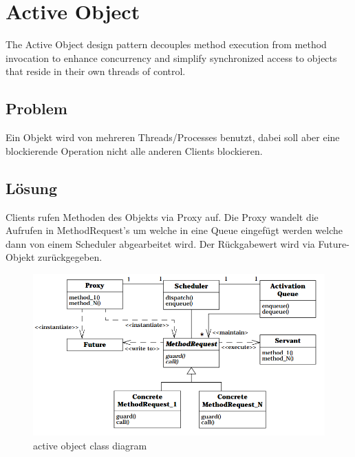 \section{Active Object}

The Active Object design pattern decouples method execution from method invocation to enhance concurrency and simplify synchronized access to objects that reside in their own threads of control.


\subsection{Problem}


Ein Objekt wird von mehreren Threads/Processes benutzt, dabei soll aber eine blockierende Operation nicht alle anderen Clients blockieren.

\subsection{Lösung}


Clients rufen Methoden des Objekts via Proxy auf. Die Proxy wandelt die Aufrufen in MethodRequest's um welche in eine Queue eingefügt werden welche dann von einem Scheduler abgearbeitet wird.
Der Rückgabewert wird via Future-Objekt zurückgegeben.

\begin{figure}[H]
	\centering
	\includegraphics[width=\textwidth]{content/posa2/active-object/images/act-obj_class-diagram.png}
	\caption{active object class diagram}
\end{figure}


